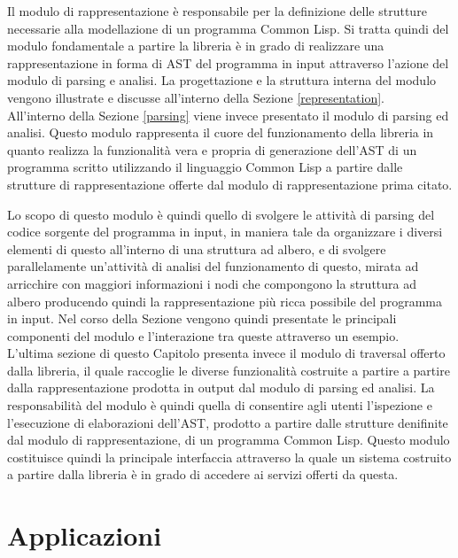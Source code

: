 \documentclass{book}
\begin{document}
Il modulo di rappresentazione è responsabile per la definizione delle strutture
necessarie alla modellazione di un programma Common Lisp. Si tratta quindi del
modulo fondamentale a partire la libreria è in grado di realizzare una
rappresentazione in forma di AST del programma in input attraverso l'azione del
modulo di parsing e analisi. La progettazione e la struttura interna del modulo
vengono illustrate e discusse all'interno della Sezione \ref{representation}.\\

All'interno della Sezione \ref{parsing} viene invece presentato il modulo di
parsing ed analisi. Questo modulo rappresenta il cuore del funzionamento della
libreria in quanto realizza la funzionalità vera e propria di generazione
dell'AST di un programma scritto utilizzando il linguaggio Common Lisp a partire
dalle strutture di rappresentazione offerte dal modulo di rappresentazione prima
citato.

Lo scopo di questo modulo è quindi quello di svolgere le attività di parsing del
codice sorgente del programma in input, in maniera tale da organizzare i diversi
elementi di questo all'interno di una struttura ad albero, e di svolgere
parallelamente un'attività di analisi del funzionamento di questo, mirata ad
arricchire con maggiori informazioni i nodi che compongono la struttura ad
albero producendo quindi la rappresentazione più ricca possibile del programma
in input. Nel corso della Sezione vengono quindi presentate le principali
componenti del modulo e l'interazione tra queste attraverso un esempio.\\

L'ultima sezione di questo Capitolo presenta invece il modulo di traversal
offerto dalla libreria, il quale raccoglie le diverse funzionalità costruite a
partire a partire dalla rappresentazione prodotta in output dal modulo di
parsing ed analisi. La responsabilità del modulo è quindi quella di consentire
agli utenti l'ispezione e l'esecuzione di elaborazioni dell'AST, prodotto a
partire dalle strutture denifinite dal modulo di rappresentazione, di un
programma Common Lisp. Questo modulo costituisce quindi la principale
interfaccia attraverso la quale un sistema costruito a partire dalla libreria è
in grado di accedere ai servizi offerti da questa.





\endgroup

\chapter{Applicazioni}
\label{applications}
\end{document}
